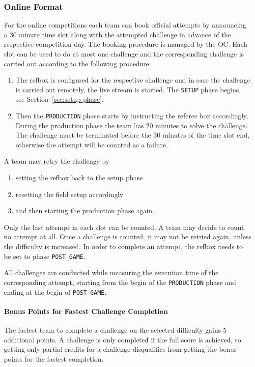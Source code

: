 \documentclass[12pt,twoside]{article}
\newcommand{\refsec}[1]{Section~\ref{#1}}
\begin{document}
\subsubsection{Online Format}
For the online competitions each team can book official
attempts by announcing a 30 minute time slot along with the attempted challenge
in advance of the respective competition day.
The booking procedure is managed by the \ac{OC}.
Each slot can be used to do at most one challenge and the corresponding
challenge is carried out according to the following procedure:
\begin{enumerate}
  \item The \ac{refbox} is configured for the respective challenge and in case
    the challenge is carried out remotely, the live stream is started.
    The \texttt{SETUP} phase begins, see \refsec{sec:setup-phase}.
	\item Then the \texttt{PRODUCTION} phase starts by instructing the referee
    box accordingly.
    During the production phase the team has 20 minutes to solve the challenge.
    The challenge must be terminated before the 30 minutes of the time slot end,
    otherwise the attempt will be counted as a failure.
\end{enumerate}


A team may retry the challenge by
\begin{enumerate}
	\item setting the \ac{refbox} back to the setup phase
	\item resetting the field setup accordingly
	\item and then starting the production phase again.
\end{enumerate}
Only the last attempt in each slot can be counted. A team may decide to count
no attempt at all. Once a challenge is counted, it
may not be retried again, unless the difficulty is increased.
In order to complete an attempt, the \ac{refbox} needs to be set to phase
\texttt{POST\_GAME}.

All challenges are conducted while measuring the execution time of the
corresponding attempt, starting from the begin of the \texttt{PRODUCTION} phase
and ending at the begin of \texttt{POST\_GAME}.

\paragraph{Bonus Points for Fastest Challenge Completion}
The fastest team to complete a challenge on the selected difficulty gains $5$
additional points. A challenge is only completed if the full score is achieved,
so getting only partial credits for a challenge disqualifies from getting the
bonus points for the fastest completion.
\end{document}
